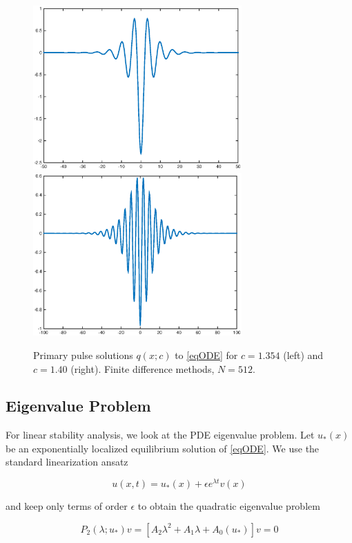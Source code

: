 \documentclass[12pt]{article}
\begin{document}
\begin{figure}[H]
\centering
\includegraphics[width=8cm]{single1354.eps}
\includegraphics[width=8cm]{single14.eps}
\label{fig:single1}
\caption{Primary pulse solutions $q(x;c)$ to \eqref{eqODE} for $c = 1.354$ (left) and $c = 1.40$ (right). Finite difference methods, $N = 512$.}
\end{figure}

\subsection{Eigenvalue Problem}

For linear stability analysis, we look at the PDE eigenvalue problem. Let $u_*(x)$ be an exponentially localized equilibrium solution of \eqref{eqODE}. We use the standard linearization ansatz

\begin{equation}
u(x,t) = u_*(x) + \epsilon e^{\lambda t} v(x)
\end{equation}

and keep only terms of order $\epsilon$ to obtain the quadratic eigenvalue problem

\begin{equation}\label{quadeig}
P_2(\lambda; u_*)v =  [A_2 \lambda^2 + A_1 \lambda + A_0(u_*)]v = 0
\end{equation}
\end{document}
